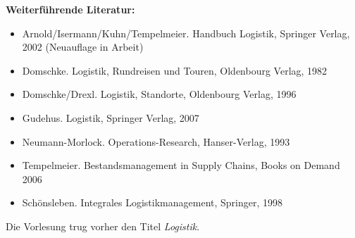 \begin{course}
\begin{media}
\end{media}

\begin{literature}\textbf{Weiterführende Literatur:}

 \begin{itemize}\item Arnold/Isermann/Kuhn/Tempelmeier. Handbuch Logistik, Springer Verlag, 2002 (Neuauflage in Arbeit)  \item Domschke. Logistik, Rundreisen und Touren, Oldenbourg Verlag, 1982  \item Domschke/Drexl. Logistik, Standorte, Oldenbourg Verlag, 1996  \item Gudehus. Logistik, Springer Verlag, 2007  \item Neumann-Morlock. Operations-Research, Hanser-Verlag, 1993  \item Tempelmeier. Bestandsmanagement in Supply Chains, Books on Demand 2006  \item Schönsleben. Integrales Logistikmanagement, Springer, 1998  \end{itemize}\end{literature}

\begin{remarks}Die Vorlesung trug vorher den Titel \emph{Logistik}.

\end{remarks}

\end{course}